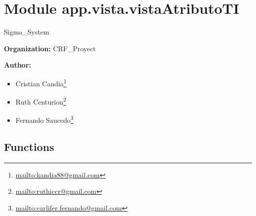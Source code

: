 %
%
%


\section{Module app.vista.vistaAtributoTI}

    \label{app:vista:vistaAtributoTI}
Sigma\_System

\textbf{Organization:} CRF\_Proyect



\textbf{Author:} \begin{itemize}
\setlength{\parskip}{0.6ex}
  \item Cristian 
    Candia\footnote{\href{mailto:kandia88@gmail.com}{mailto:kandia88@gmail.com}}

  \item Ruth 
    Centurion\footnote{\href{mailto:ruthiccr@gmail.com}{mailto:ruthiccr@gmail.com}}

  \item Fernando 
    Saucedo\footnote{\href{mailto:carlifer.fernando@gmail.com}{mailto:carlifer.fernando@gmail.com}}

\end{itemize}





  \subsection{Functions}

    \label{app:vista:vistaAtributoTI:atributoTI}

    \vspace{0.5ex}

